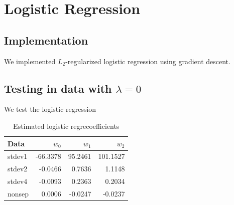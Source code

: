 
\section{Logistic Regression}\label{sec:lr}

\subsection{Implementation}
We implemented $L_2$-regularized logistic regression using gradient descent.

\subsection{Testing in data with $\lambda = 0$}
We test the logistic regression 


\begin{table}[h!]
\centering
\caption{Estimated logistic regrecoefficients }
\begin{tabular}{lrrr}
  \hline\hline
  Data   & $w_0$ 	& $w_1$ 	  & $w_2$ \\
  \hline
  stdev1 & -66.3378  & 95.2461 & 101.1527 \\
  stdev2 & -0.0466   & 0.7636  & 1.1148 \\
  stdev4 & -0.0093   & 0.2363  & 0.2034 \\
  nonsep & 0.0006    & -0.0247 & -0.0237\\
  \hline\hline
\end{tabular}
\end{table}


